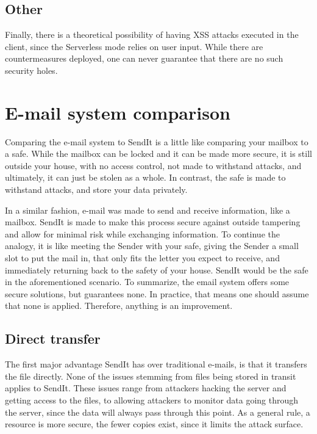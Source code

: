   \subsection{Other}
  Finally, there is a theoretical possibility of having XSS attacks executed in the client, since the Serverless mode relies on user input. While there are countermeasures deployed, one can never guarantee that there are no such security holes.

%
%
\section{E-mail system comparison}
\label{sec:email_syst}
  Comparing the e-mail system to SendIt is a little like comparing your mailbox to a safe. While the mailbox can be locked and it can be made more secure, it is still outside your house, with no access control, not made to withstand attacks, and ultimately, it can just be stolen as a whole. In contrast, the safe is made to withstand attacks, and store your data privately.

  In a similar fashion, e-mail was made to send and receive information, like a mailbox. SendIt is made to make this process secure against outside tampering and allow for minimal risk while exchanging information. To continue the analogy, it is like meeting the Sender with your safe, giving the Sender a small slot to put the mail in, that only fits the letter you expect to receive, and immediately returning back to the safety of your house. SendIt would be the safe in the aforementioned scenario. To summarize, the email system offers some secure solutions, but guarantees none. In practice, that means one should assume that none is applied. Therefore, anything is an improvement.
%
%
  \subsection{Direct transfer}
  \label{sec:ev_dir}
  The first major advantage SendIt has over traditional e-mails, is that it transfers the file directly. None of the issues stemming from files being stored in transit applies to SendIt. These issues range from attackers hacking the server and getting access to the files, to allowing attackers to monitor data going through the server, since the data will always pass through this point. As a general rule, a resource is more secure, the fewer copies exist, since it limits the attack surface.

